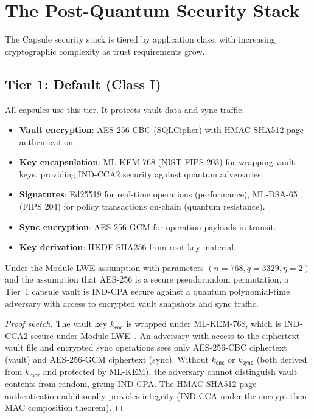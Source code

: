 \section{The Post-Quantum Security Stack}
\label{sec:pq}

The Capsule security stack is tiered by application class, with increasing
cryptographic complexity as trust requirements grow.

\subsection{Tier 1: Default (Class I)}

All capsules use this tier. It protects vault data and sync traffic.

\begin{itemize}[nosep]
  \item \textbf{Vault encryption}: AES-256-CBC (SQLCipher) with HMAC-SHA512
        page authentication.
  \item \textbf{Key encapsulation}: ML-KEM-768 (NIST FIPS 203) for wrapping
        vault keys, providing IND-CCA2 security against quantum adversaries.
  \item \textbf{Signatures}: Ed25519 for real-time operations (performance),
        ML-DSA-65 (FIPS 204) for policy transactions on-chain (quantum
        resistance).
  \item \textbf{Sync encryption}: AES-256-GCM for operation payloads in transit.
  \item \textbf{Key derivation}: HKDF-SHA256 from root key material.
\end{itemize}

\begin{theorem}\label{thm:tier1}
Under the Module-LWE assumption with parameters $(n=768, q=3329, \eta=2)$
and the assumption that AES-256 is a secure pseudorandom permutation, a
Tier~1 capsule vault is IND-CPA secure against a quantum polynomial-time
adversary with access to encrypted vault snapshots and sync traffic.
\end{theorem}

\begin{proof}[Proof sketch]
The vault key $k_{\mathsf{enc}}$ is wrapped under ML-KEM-768, which is
IND-CCA2 secure under Module-LWE~\cite{lux-pq-crypto}. An adversary with
access to the ciphertext vault file and encrypted sync operations sees only
AES-256-CBC ciphertext (vault) and AES-256-GCM ciphertext (sync). Without
$k_{\mathsf{enc}}$ or $k_{\mathsf{sync}}$ (both derived from $k_{\mathsf{root}}$
and protected by ML-KEM), the adversary cannot distinguish vault contents from
random, giving IND-CPA. The HMAC-SHA512 page authentication additionally provides
integrity (IND-CCA under the encrypt-then-MAC composition theorem).
\end{proof}


